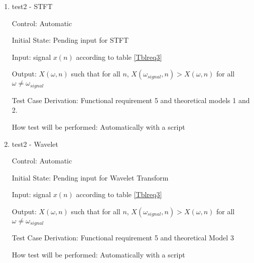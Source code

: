 \documentclass[12pt, titlepage]{article}
\begin{document}
\begin{enumerate}
\item{test2 - STFT\\}

Control: Automatic
					
Initial State: Pending input for STFT
					
Input: signal $x(n)$ according to table \ref{Tblreq3}
					
Output: $X(\omega, n)$ such that for all $n$, $X(\omega_{signal}, n) > X(\omega, n)$ for all $\omega \neq \omega_{signal}$

Test Case Derivation: Functional requirement 5 and theoretical models 1 and 2.
					
How test will be performed: Automatically with a script

\item{test2 - Wavelet\\}

Control: Automatic
					
Initial State: Pending input for Wavelet Transform
					
Input: signal $x(n)$ according to table \ref{Tblreq3}
					
Output:  $X(\omega, n)$ such that for all $n$, $X(\omega_{signal}, n) > X(\omega, n)$ for all $\omega \neq \omega_{signal}$

Test Case Derivation: Functional requirement 5 and theoretical Model 3
					
How test will be performed: Automatically with a script


\end{enumerate}
\end{document}
